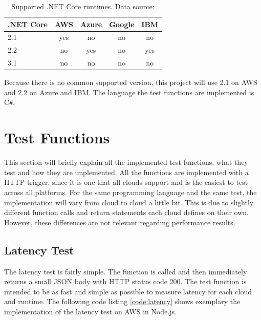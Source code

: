 \begin{table}[htp]
\centering
\captionsetup[table]{justification=centering, labelfont=bf}
\begin{tabular}{|l|c|c|c|c|} 
 \hline
 .NET Core & AWS & Azure & Google & IBM \\ \hline
2.1  & \cellcolor{green!25}yes    & \cellcolor{red!25}no    & \cellcolor{red!25}no  & \cellcolor{red!25}no\\ \hline
2.2  & \cellcolor{red!25}no    & \cellcolor{green!25}yes    & \cellcolor{red!25}no  & \cellcolor{green!25}yes\\ \hline
3.1  & \cellcolor{red!25}no    & \cellcolor{red!25}no    & \cellcolor{red!25}no  & \cellcolor{red!25}no\\ \hline
\end{tabular}
\caption[Supported .NET Core runtimes]{Supported .NET Core runtimes. Data source: \cite{AWSLambdaLanguages, AzureFunctionsLanguages, GoogleFunctionsLanguages, IBMRuntimes}}
\label{table:dotnet}
\end{table}

Because there is no common supported version, this project will use 2.1 on \gls{AWS} and 2.2 on Azure and \gls{IBM}. The language the test functions are implemented is C\texttt{\#}.

\section{Test Functions}
\label{sec:tests}
This section will briefly explain all the implemented test functions, what they test and how they are implemented. All the functions are implemented with a \gls{HTTP} trigger, since it is one that all clouds support and is the easiest to test across all platforms. For the same programming language and the same test, the implementation will vary from cloud to cloud a little bit. This is due to slightly different function calls and return statements each cloud defines on their own. However, these differences are not relevant regarding performance results.
\subsection{Latency Test}
\label{subsec:latency}
The latency test  is fairly simple. The function is called and then immediately returns a small \gls{JSON} body with \gls{HTTP} status code 200. The test function is intended to be as fast and simple as possible to measure latency for each cloud and runtime. The following code listing \ref{code:latency} shows exemplary the implementation of the latency test on \gls{AWS} in Node.js.

